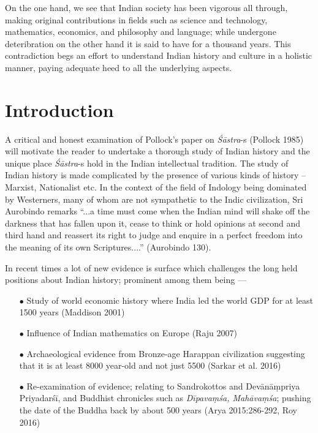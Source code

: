 On the one hand, we see that Indian society has been vigorous all through, making original contributions in ﬁelds such as science and technology, mathematics, economics, and philosophy and language; while undergone deteribration on the other hand it is said to have for a thousand years. This contradiction begs an effort to understand Indian history and culture in a holistic manner, paying adequate heed to all the underlying aspects.

\section{Introduction}\label{art12-sec1}

A critical and honest examination of Pollock's paper on {\sl Śāstra}-s (Pollock 1985) will motivate the reader to undertake a thorough study of Indian history and the unique place {\sl Śāstra}-s hold in the Indian intellectual tradition. The study of Indian history is made complicated by the presence of various kinds of history -- Marxist, Nationalist etc. In the context of the ﬁeld of Indology being dominated by Westerners, many of whom are not sympathetic to the Indic civilization, Sri Aurobindo remarks ``...a time must come when the Indian mind will shake off the darkness that has fallen upon it, cease to think or hold opinions at second and third hand and reassert its right to judge and enquire in a perfect freedom into the meaning of its own Scriptures....'' (Aurobindo 130). 

In recent times a lot of new evidence is surface which challenges the long held positions about Indian history; prominent among them being ---
\begin{itemize}
\item[$\bullet$] Study of world economic history where India led the world GDP for at least 1500 years (Maddison 2001)

\item[$\bullet$] Inﬂuence of Indian mathematics on Europe (Raju 2007)

\item[$\bullet$] Archaeological evidence from Bronze-age Harappan civilization suggesting that it is at least 8000 year-old and not just 5500 (Sarkar et al. 2016)

\item[$\bullet$] Re-examination of evidence; relating to Sandrokottos and Devānāṃpriya Priyadarśī, and Buddhist chronicles such as {\sl Dīpavaṃśa, Mahāvaṃśa}; pushing the date of the Buddha back by about 500 years (Arya 2015:286-292, Roy 2016)
\end{itemize}

